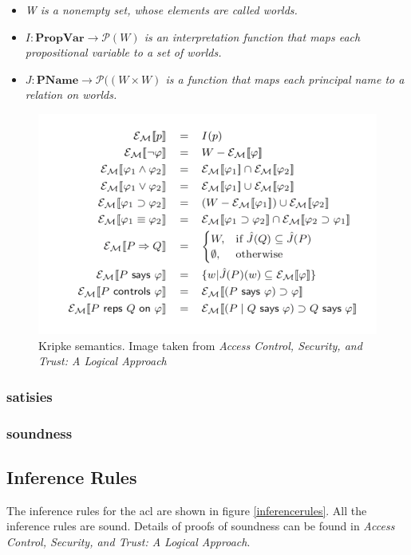 \documentclass[../../main/main.tex]{subfiles}
\begin{document}
\begin{itemize}
\item \textit{W is a nonempty set, whose elements are called worlds.}
\item \textit{$I: \mathbf{PropVar} \rightarrow \mathcal{P}(W)$ is an interpretation function that maps each propositional variable to a set of worlds.}
\item \textit{$J: \mathbf{PName} \rightarrow \mathcal{P}((W \times W)$ is a function that maps each principal name to a relation on worlds.}
\end{itemize}


\begin{figure}[h]
\centering
\includegraphics{../figures/kripkesemantics}
\caption{\label{kripkesemantics} Kripke semantics. Image taken from \textit{Access Control, Security, and Trust: A Logical Approach}\cite{ChinOlder}}
\end{figure}

\subsubsection{satisies}\label{sssec:satisfies}
\subsubsection{soundness}\label{sssec:soundness}

\subsection{Inference Rules}\label{ssec:inferencerules}
The inference rules for the \gls{acl} are shown in figure \ref{inferencerules}.  All the inference rules are sound.  Details of proofs of soundness can be found in \textit{Access Control, Security, and Trust: A Logical Approach}\cite{ChinOlder}.
\end{document}
